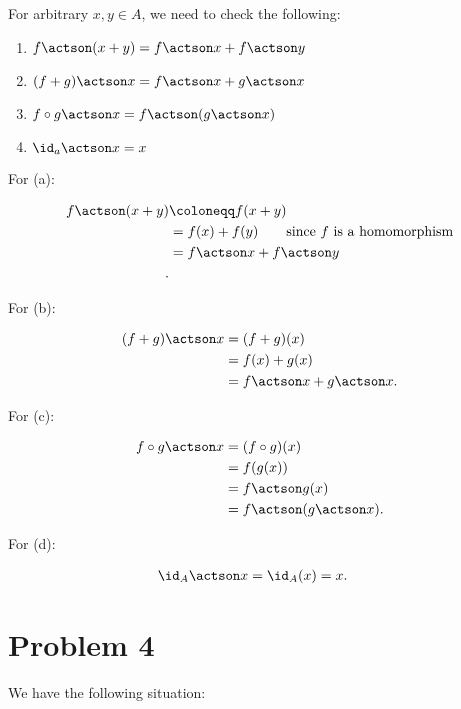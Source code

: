 For arbitrary \(x, y \in A\), we need to check the following:

\begin{enumerate}
\def\labelenumi{\alph{enumi}.}
\tightlist
\item
  \(f\actson (x+y) = f\actson x + f \actson y\)
\item
  \((f+g)\actson x = f \actson x + g \actson x\)
\item
  \(f\circ g \actson x = f \actson (g \actson x)\)
\item
  \(\id_a \actson x = x\)
\end{enumerate}

For (a):

\begin{align*}
f \actson (x + y) &\coloneqq f(x + y) \\
&= f(x) + f(y)\quad\quad\text{since $f$ is a homomorphism} \\
&= f\actson x + f \actson y \\
.\end{align*}

For (b):

\begin{align*}
(f+g)\actson x &= (f+g)(x) \\
&= f(x) + g(x) \\
&= f \actson x + g \actson x
.\end{align*}

For (c):

\begin{align*}
f\circ g \actson x &= (f\circ g)(x)  \\
&= f(g(x)) \\
&= f \actson g(x) \\
&= f \actson (g \actson x)
.\end{align*}

For (d):

\begin{align*}
\id_A \actson x &= \id_A(x) = x
.\end{align*}

\hypertarget{problem-4}{%
\section{Problem 4}\label{problem-4}}

We have the following situation:






